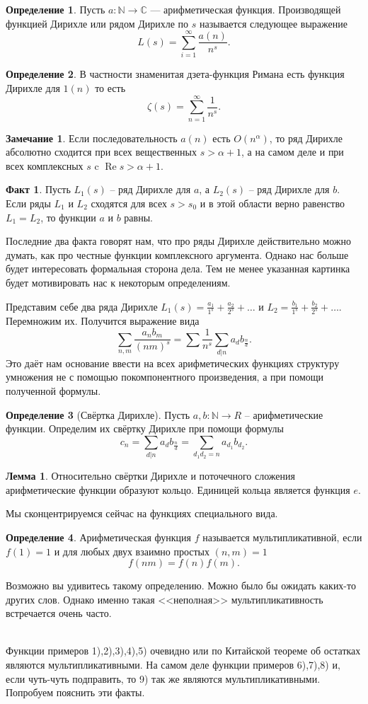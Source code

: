 \documentclass[10pt,a4paper,oneside]{book}
\theoremstyle{definition}
\newtheorem*{rem}{Замечание}
\newtheorem*{defn}{{\color{yellow!30!red} Определение}}
\newtheorem*{fact}{Факт}
\newtheorem{lem}{{\color{green!50!black} Лемма}}
\newcommand{\mb}[1]{\mathbb{#1}}
\newcommand{\re}{\operatorname{Re}}
\def\exm{\noindent {\bf Примеры:}}
\def\dfn{\begin{defn}}
\def\edfn{\end{defn}}
\def\lm{\begin{lem}}
\def\elm{\end{lem}}
\def\rm{\begin{rem}}
\def\erm{\end{rem}}
\def\fct{\begin{fact}}
\def\efct{\end{fact}}
\begin{document}
\dfn Пусть $a\colon \mb N\to \mb C$ --- арифметическая функция. Производящей функцией Дирихле или рядом Дирихле по $s$ называется следующее выражение
$$L(s)=\sum_{i=1}^{\infty} \frac{a(n)}{n^s}.$$ 
\edfn

\dfn В частности знаменитая дзета-функция Римана есть функция Дирихле для $1(n)$ то есть
$$\zeta(s)=\sum_{n=1}^{\infty}\frac{1}{n^s}.$$
\edfn

\rm Если последовательность $a(n)$ есть $O(n^{\alpha})$, то ряд Дирихле абсолютно сходится при всех вещественных $s>\alpha+1$, а на самом деле и при всех комплексных $s$ c $\re s>\alpha+1$.
\erm

\fct Пусть $L_1(s)$ -- ряд Дирихле для $a$, а $L_2(s)$ -- ряд Дирихле для $b$. Если ряды $L_1$ и $L_2$ сходятся для всех $s>s_0$ и в этой области верно равенство $L_1=L_2$, то функции $a$ и $b$ равны.
\efct

Последние два факта говорят нам, что про ряды Дирихле действительно можно думать, как про честные функции комплексного аргумента. Однако нас больше будет интересовать формальная сторона дела. Тем не менее указанная картинка будет мотивировать нас к некоторым определениям.

Представим себе два ряда Дирихле $L_1(s)=\frac{a_1}{1^s}+\frac{a_2}{2^s}+\dots$ и $L_2=\frac{b_1}{1^s}+\frac{b_2}{2^s}+\dots$. Перемножим их. Получится выражение вида 
$$\sum_{n,m} \frac{a_nb_m}{(nm)^s}=\sum \frac{1}{n^s}\sum_{d|n}a_db_{\frac{n}{d}}.$$
Это даёт нам основание ввести на всех арифметических функциях структуру умножения не с помощью покомпонентного произведения, а при помощи полученной формулы.

\dfn[Свёртка Дирихле] Пусть $a,b\colon \mb N \to R$ -- арифметические функции. Определим их свёртку Дирихле при помощи формулы $$c_n=\sum_{d|n}a_db_{\frac{n}{d}}=\sum_{d_1d_2=n}a_{d_1}b_{d_2}.$$
\edfn

\lm Относительно свёртки Дирихле и поточечного сложения арифметические функции образуют кольцо. Единицей кольца является функция $e$.
\elm

Мы сконцентрируемся сейчас на функциях специального вида.

\dfn Арифметическая функция $f$ называется мультипликативной, если $f(1)=1$ и для любых двух взаимно простых $(n,m)=1$ 
$$f(nm)=f(n)f(m).$$ 
\edfn
Возможно вы удивитесь такому определению. Можно было бы ожидать каких-то других слов. Однако именно такая <<неполная>> мультипликативность встречается очень часто.

\exm\\
Функции примеров 1),2),3),4),5) очевидно или по Китайской теореме об остатках являются мультипликативными. На самом деле функции примеров 6),7),8) и, если чуть-чуть подправить, то 9) так же являются мультипликативными. Попробуем пояснить эти факты.
\end{document}
